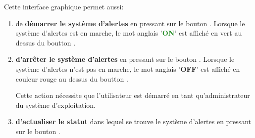 Cette interface graphique permet aussi:
\begin{enumerate}[1)]
	\item de \textbf{d\'emarrer le syst\`eme d'alertes} en pressant
		sur le bouton . Lorsque le syst\`eme
		d'alertes est en marche, le mot anglais
		'\textbf{\textcolor{forestgreen}{ON}}' est
		affich\'e en vert au dessus du boutton .
		
	\item \textbf{d'arr\^eter le syst\`eme d'alertes} en pressant
		sur le bouton . Lorsque le syst\`eme
		d'alertes n'est pas en marche, le mot anglais
		'\textbf{\textcolor{firebrickred}{OFF}}' est
		affich\'e en couleur rouge au dessus du boutton .
		
		Cette action n\'ecessite que l'utilisateur est d\'emarr\'e
		\yeroth en tant qu'administrateur du syst\`eme d'exploitation.
		
	\item \textbf{d'actualiser le statut} dans lequel se trouve
		le syst\`eme d'alertes en pressant sur le bouton
		.		
\end{enumerate}

\newpage

\newpage



\newpage



\newpage



\newpage



\newpage




